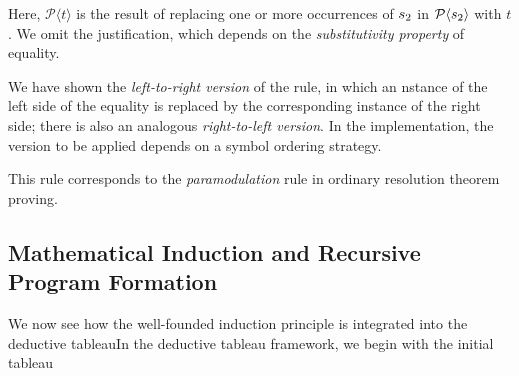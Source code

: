 \documentclass[runningheads]{llncs}
\DeclareMathOperator{\uand}{\emph{and}\,}
\DeclareMathOperator{\unot}{\emph{not}\kern-.0pt}
\begin{document}
 






\noindent Here, $\mathcal{P}\langle t\rangle$ is the result of replacing one or more occurrences of ${s}_{2}$ in $\mathcal{P}\langle{s}_{2}\rangle$ with $t$. We omit the justification, which depends on the \emph{substitutivity property} of equality. 

We have shown the \emph{left-to-right version} of the rule, in which an nstance of the left side of the equality is replaced by the corresponding instance of the right side;  there is also an analogous \emph{right-to-left version}. In the {\SNARK} implementation, the version to be applied depends on a symbol ordering strategy.



This rule corresponds to the \emph{paramodulation} rule in ordinary resolution theorem proving.





\subsection{Mathematical Induction and Recursive Program Formation}   We now see how the well-founded induction principle is integrated into the deductive tableauIn the deductive tableau framework, we begin with the initial tableau 
\end{document}
